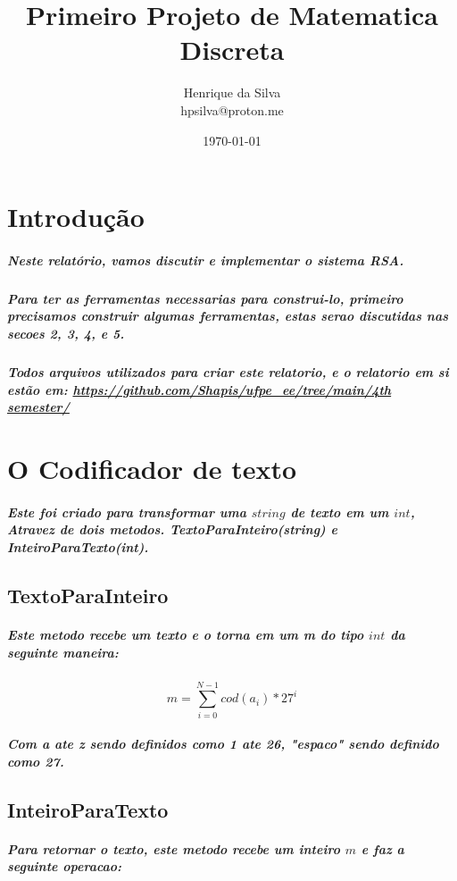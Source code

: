 \documentclass[12pt,twoside, a4paper, twocolumn]{article}
\title{Primeiro Projeto de Matematica Discreta}
\author{Henrique da Silva \\ hpsilva@proton.me}
\date{\today}
\begin{document}
\maketitle
{}
\newpage
\tableofcontents
\newpage



\section{Introdução}


\subparagraph*{Neste relatório, vamos discutir e implementar o sistema RSA.}

\subparagraph*{Para ter as ferramentas necessarias para construi-lo, primeiro precisamos construir algumas ferramentas, estas serao discutidas nas secoes 2, 3, 4, e 5.}

\subparagraph*{Todos arquivos utilizados para criar este relatorio, e o relatorio em si estão em:  \url{https://github.com/Shapis/ufpe_ee/tree/main/4th semester/}}

\section{O Codificador de texto}

\subparagraph*{Este foi criado para transformar uma $string$ de texto em um $int$, Atravez de dois metodos. TextoParaInteiro(string) e InteiroParaTexto(int). }

\subsection{TextoParaInteiro}

\subparagraph*{Este metodo recebe um texto e o torna em um m do tipo $int$ da seguinte maneira:}

\begin{equation}
    m = \sum_{i=0}^{N - 1} cod(a_i)*27^i
\end{equation}

\subparagraph*{Com \emph{a} ate \emph{z} sendo definidos como 1 ate 26, "espaco" sendo definido como 27.}

\subsection{InteiroParaTexto}

\subparagraph*{Para retornar o texto, este metodo recebe um inteiro $m$ e faz a seguinte operacao:}
\end{document}
